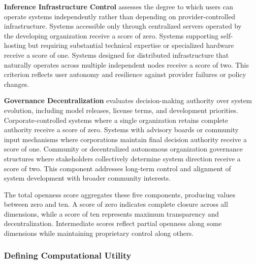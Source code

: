 \textbf{Inference Infrastructure Control} assesses the degree to which users can operate systems independently rather than depending on provider-controlled infrastructure. Systems accessible only through centralized servers operated by the developing organization receive a score of zero. Systems supporting self-hosting but requiring substantial technical expertise or specialized hardware receive a score of one. Systems designed for distributed infrastructure that naturally operates across multiple independent nodes receive a score of two. This criterion reflects user autonomy and resilience against provider failures or policy changes.

\textbf{Governance Decentralization} evaluates decision-making authority over system evolution, including model releases, license terms, and development priorities. Corporate-controlled systems where a single organization retains complete authority receive a score of zero. Systems with advisory boards or community input mechanisms where corporations maintain final decision authority receive a score of one. Community or decentralized autonomous organization governance structures where stakeholders collectively determine system direction receive a score of two. This component addresses long-term control and alignment of system development with broader community interests.

The total openness score aggregates these five components, producing values between zero and ten. A score of zero indicates complete closure across all dimensions, while a score of ten represents maximum transparency and decentralization. Intermediate scores reflect partial openness along some dimensions while maintaining proprietary control along others.

\subsubsection{Defining Computational Utility}

